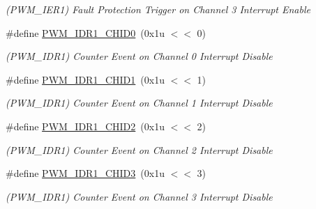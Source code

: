\begin{DoxyCompactItemize}
\begin{DoxyCompactList}\small\item\em (P\+W\+M\+\_\+\+I\+E\+R1) Fault Protection Trigger on Channel 3 Interrupt Enable \end{DoxyCompactList}\item 
\mbox{\label{group__SAME70__PWM_gaac74a9e06fc4dd8a1c2e30bcaaa6dd17}} 
\#define \mbox{\hyperlink{group__SAME70__PWM_gaac74a9e06fc4dd8a1c2e30bcaaa6dd17}{P\+W\+M\+\_\+\+I\+D\+R1\+\_\+\+C\+H\+I\+D0}}~(0x1u $<$$<$ 0)
\begin{DoxyCompactList}\small\item\em (P\+W\+M\+\_\+\+I\+D\+R1) Counter Event on Channel 0 Interrupt Disable \end{DoxyCompactList}\item 
\mbox{\label{group__SAME70__PWM_ga80cc87b54b89b298d6bf32700df8cb9a}} 
\#define \mbox{\hyperlink{group__SAME70__PWM_ga80cc87b54b89b298d6bf32700df8cb9a}{P\+W\+M\+\_\+\+I\+D\+R1\+\_\+\+C\+H\+I\+D1}}~(0x1u $<$$<$ 1)
\begin{DoxyCompactList}\small\item\em (P\+W\+M\+\_\+\+I\+D\+R1) Counter Event on Channel 1 Interrupt Disable \end{DoxyCompactList}\item 
\mbox{\label{group__SAME70__PWM_ga668fe202fa0cdba3d8e740339740a455}} 
\#define \mbox{\hyperlink{group__SAME70__PWM_ga668fe202fa0cdba3d8e740339740a455}{P\+W\+M\+\_\+\+I\+D\+R1\+\_\+\+C\+H\+I\+D2}}~(0x1u $<$$<$ 2)
\begin{DoxyCompactList}\small\item\em (P\+W\+M\+\_\+\+I\+D\+R1) Counter Event on Channel 2 Interrupt Disable \end{DoxyCompactList}\item 
\mbox{\label{group__SAME70__PWM_ga5436d6d3d46e185a265960da08b61718}} 
\#define \mbox{\hyperlink{group__SAME70__PWM_ga5436d6d3d46e185a265960da08b61718}{P\+W\+M\+\_\+\+I\+D\+R1\+\_\+\+C\+H\+I\+D3}}~(0x1u $<$$<$ 3)
\begin{DoxyCompactList}\small\item\em (P\+W\+M\+\_\+\+I\+D\+R1) Counter Event on Channel 3 Interrupt Disable \end{DoxyCompactList}\item 

\end{DoxyCompactItemize}

